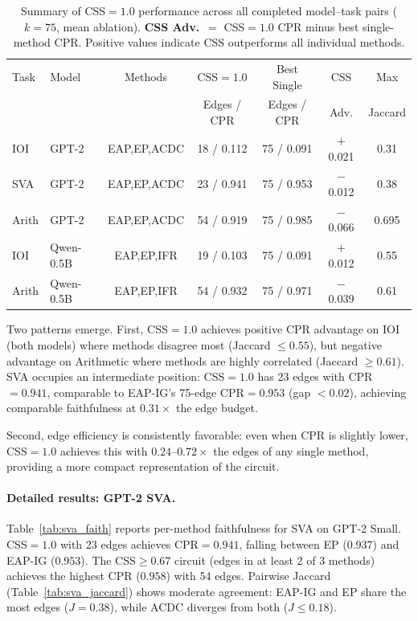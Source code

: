 \documentclass[11pt,a4paper]{article}
\newcommand{\css}{\textsc{CSS}}
\begin{document}
\begin{table}[t]
\centering
\small
\caption{Summary of \css{}$=1.0$ performance across all completed model--task pairs ($k\!=\!75$, mean ablation). \textbf{CSS Adv.}\ $=$ \css{}$=1.0$ CPR minus best single-method CPR. Positive values indicate \css{} outperforms all individual methods.}
\label{tab:summary}
\begin{tabular}{@{}llccccc@{}}
\toprule
Task & Model & Methods & \css{}$=1.0$ & Best Single & CSS & Max \\
     &       &         & Edges / CPR  & Edges / CPR & Adv. & Jaccard \\
\midrule
IOI & GPT-2 & EAP,EP,ACDC & 18 / 0.112 & 75 / 0.091 & $+$0.021 & 0.31 \\
SVA & GPT-2 & EAP,EP,ACDC & 23 / 0.941 & 75 / 0.953 & $-$0.012 & 0.38 \\
Arith & GPT-2 & EAP,EP,ACDC & 54 / 0.919 & 75 / 0.985 & $-$0.066 & 0.695 \\
\midrule
IOI & Qwen-0.5B & EAP,EP,IFR & 19 / 0.103 & 75 / 0.091 & $+$0.012 & 0.55 \\
Arith & Qwen-0.5B & EAP,EP,IFR & 54 / 0.932 & 75 / 0.971 & $-$0.039 & 0.61 \\
\bottomrule
\end{tabular}
\end{table}

Two patterns emerge.
First, \css{}$=1.0$ achieves positive CPR advantage on IOI (both models) where methods disagree most (Jaccard $\leq 0.55$), but negative advantage on Arithmetic where methods are highly correlated (Jaccard $\geq 0.61$).
SVA occupies an intermediate position: \css{}$=1.0$ has 23 edges with CPR$=0.941$, comparable to EAP-IG's 75-edge CPR$=0.953$ (gap $<0.02$), achieving comparable faithfulness at $0.31\times$ the edge budget.

Second, edge efficiency is consistently favorable: even when CPR is slightly lower, \css{}$=1.0$ achieves this with $0.24$--$0.72\times$ the edges of any single method, providing a more compact representation of the circuit.

\paragraph{Detailed results: GPT-2 SVA.}
Table~\ref{tab:sva_faith} reports per-method faithfulness for SVA on GPT-2 Small.
\css{}$=1.0$ with 23 edges achieves CPR$=0.941$, falling between EP ($0.937$) and EAP-IG ($0.953$).
The CSS$\geq 0.67$ circuit (edges in at least 2 of 3 methods) achieves the highest CPR ($0.958$) with 54 edges.
Pairwise Jaccard (Table~\ref{tab:sva_jaccard}) shows moderate agreement: EAP-IG and EP share the most edges ($J=0.38$), while ACDC diverges from both ($J \leq 0.18$).
\end{document}

